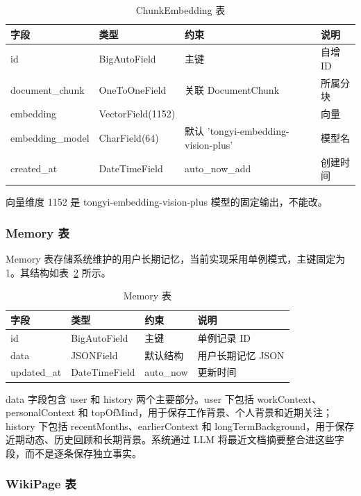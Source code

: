 \begin{table}[htb]
  \centering
  \caption{ChunkEmbedding 表}
  \label{T.chunk_embedding}
  \begin{tabular}{llll}
    \hline
    字段 & 类型 & 约束 & 说明 \\
    \hline
    id & BigAutoField & 主键 & 自增 ID \\
    document\_chunk & OneToOneField & 关联 DocumentChunk & 所属分块 \\
    embedding & VectorField(1152) & & 向量 \\
    embedding\_model & CharField(64) & 默认 'tongyi-embedding-vision-plus' & 模型名 \\
    created\_at & DateTimeField & auto\_now\_add & 创建时间 \\
    \hline
  \end{tabular}
\end{table}

向量维度 1152 是 tongyi-embedding-vision-plus 模型的固定输出，不能改。

\subsubsection{Memory 表}

Memory 表存储系统维护的用户长期记忆，当前实现采用单例模式，主键固定为 1。其结构如表~\ref{T.memory} 所示。

\begin{table}[htb]
  \centering
  \caption{Memory 表}
  \label{T.memory}
  \begin{tabular}{llll}
    \hline
    字段 & 类型 & 约束 & 说明 \\
    \hline
    id & BigAutoField & 主键 & 单例记录 ID \\
    data & JSONField & 默认结构 & 用户长期记忆 JSON \\
    updated\_at & DateTimeField & auto\_now & 更新时间 \\
    \hline
  \end{tabular}
\end{table}

data 字段包含 user 和 history 两个主要部分。user 下包括 workContext、personalContext 和 topOfMind，用于保存工作背景、个人背景和近期关注；history 下包括 recentMonths、earlierContext 和 longTermBackground，用于保存近期动态、历史回顾和长期背景。系统通过 LLM 将最近文档摘要整合进这些字段，而不是逐条保存独立事实。

\subsubsection{WikiPage 表}

